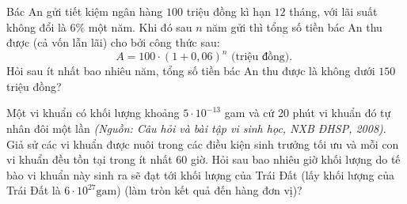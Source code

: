 \begin{vd}%
	Bác An gửi tiết kiệm ngân hàng $100$ triệu đồng kì hạn $12$ tháng, với lãi suất không đổi là $6 \%$ một năm. Khi đó sau $n$ năm gửi thì tổng số tiền bác An thu được (cả vốn lẫn lãi) cho bởi công thức sau:
	$$
	A=100 \cdot(1+0{,}06)^n \text { (triệu đồng). }
	$$
	Hỏi sau ít nhất bao nhiêu năm, tổng số tiền bác An thu được là không dưới $150$ triệu đồng?
\end{vd}
\begin{vd}%
	Một vi khuẩn có khối lượng khoảng $5 \cdot 10^{-13}$ gam và cứ 20 phút vi khuẩn đó tự nhân đôi một lần \textit{(Nguồn: Câu hỏi và bài tập vi sinh học, NXB ĐHSP, 2008)}. Giả sử các vi khuẩn được nuôi trong các điều kiện sinh trưởng tối ưu và mỗi con vi khuẩn đều tồn tại trong ít nhất 60 giờ. Hỏi sau bao nhiêu giờ khối lượng do tế bào vi khuẩn này sinh ra sẽ đạt tới khối lượng của Trái Đất (lấy khối lượng của Trái Đất là $6 \cdot 10^{27} \mathrm{gam}$) (làm tròn kết quả đến hàng đơn vị)?
\end{vd}
